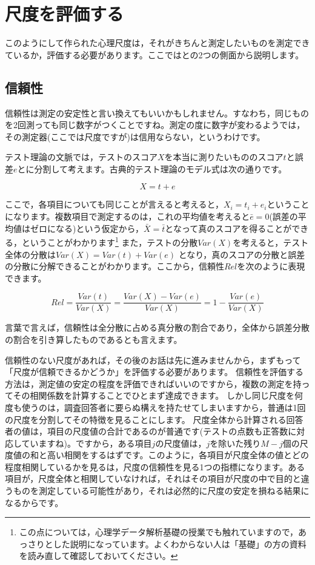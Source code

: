 \documentclass{ltjsbook}
\begin{document}
\section{尺度を評価する}
このようにして作られた心理尺度は，それがきちんと測定したいものを測定できているか，評価する必要があります。ここではとの2つの側面から説明します。
\subsection{信頼性}
信頼性は測定の安定性と言い換えてもいいかもしれません。すなわち，同じものを2回測っても同じ数字がつくことですね。測定の度に数字が変わるようでは，その測定器(ここでは尺度ですが)は信用ならない，というわけです。

テスト理論の文脈では，テストのスコア$X$を本当に測りたいもののスコア$t$と誤差$e$とに分割して考えます。古典的テスト理論のモデル式は次の通りです。

\[ X = t + e \]

ここで，各項目についても同じことが言えると考えると，$X_i = t_i + e_i$ということになります。複数項目で測定するのは，これの平均値を考えると$\bar{e}=0$(誤差の平均値はゼロになる)という仮定から，$\bar{X}=\bar{t}$となって真のスコアを得ることができる，ということがわかります\footnote{この点については，心理学データ解析基礎の授業でも触れていますので，あっさりとした説明になっています。よくわからない人は「基礎」の方の資料を読み直して確認しておいてください。}
また，テストの分散$Var(X)$を考えると，テスト全体の分散は$Var(X)=Var(t)+Var(e)$ となり，真のスコアの分散と誤差の分散に分解できることがわかります。ここから，信頼性$Rel$を次のように表現できます。

\[Rel = \frac{Var(t)}{Var(X)}= \frac{Var(X)-Var(e)}{Var(X)} = 1-\frac{Var(e)}{Var(X)}\]

言葉で言えば，信頼性は全分散に占める真分散の割合であり，全体から誤差分散の割合を引き算したものであるとも言えます。

信頼性のない尺度があれば，その後のお話は先に進みませんから，まずもって「尺度が信頼できるかどうか」を評価する必要があります。
信頼性を評価する方法は，測定値の安定の程度を評価できればいいのですから，複数の測定を持ってその相関係数を計算することでひとまず達成できます。
しかし同じ尺度を何度も使うのは，調査回答者に要らぬ構えを持たせてしまいますから，普通は1回の尺度を分割してその特徴を見ることにします。
尺度全体から計算される回答者の値は，項目の尺度値の合計であるのが普通です(テストの点数も正答数に対応していますね)。ですから，ある項目$j$の尺度値は，$j$を除いた残り$M-j$個の尺度値の和と高い相関をするはずです。このように，各項目が尺度全体の値とどの程度相関しているかを見るは，尺度の信頼性を見る1つの指標になります。ある項目が，尺度全体と相関していなければ，それはその項目が尺度の中で目的と違うものを測定している可能性があり，それは必然的に尺度の安定を損ねる結果になるからです。
\end{document}
